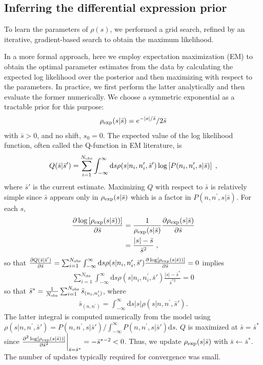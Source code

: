 \documentclass[pre,twocolumn,english,longbibliography]{revtex4}
\newcommand{\<}{\langle}
\renewcommand{\>}{\rangle}
\begin{document}
\subsection*{Inferring the differential expression prior}\label{sec:EM}
To learn the parameters of $\rho(s)$, we performed a grid search, refined by an iterative, gradient-based search to obtain the maximum likelihood.

In a more formal approach, here we employ expectation maximization (EM) to obtain the optimal parameter estimates from the data by calculating the expected log likelihood over the posterior and then maximizing with respect to the parameters. In practice, we first perform the latter analytically and then evaluate the former numerically. We choose a symmetric exponential as a tractable prior for this purpose:
\begin{align}
	\rho_{\rm exp}(s|\bar{s})=e^{-|s|/\bar{s}}/2\bar{s}
\end{align}
with $\bar{s}>0$, and no shift, $s_0=0$. The expected value of the log likelihood function, often called the Q-function in EM literature, is 
 \begin{align}
 Q(\bar{s}|\bar{s}')=\sum_{i=1}^{N_\textrm{\textrm{obs}}}\int_{-\infty}^{\infty}\mathrm{d}s\rho(s|n_i,n_i^{\prime},\bar{s}')\log \left[P(n_i,n_i^{\prime},s|\bar{s})\right]\;,
 \end{align}
 where $\bar{s}'$ is the current estimate.
 Maximizing $Q$  with respect to $\bar{s}$ is relatively simple since $\bar{s}$ appears only in $\rho_{\rm exp}(s|\bar{s})$  which is a factor in $P(n,n^{\prime},s|\bar{s})$. For each $s$,
 \begin{align}
 \frac{\partial \log \left[\rho_{\rm exp}(s|\bar{s}))\right] }{\partial\bar{s}} &=\frac{1}{\rho_{\rm exp}(s|\bar{s})} \frac{\partial\rho_{\rm exp}(s|\bar{s})}{\partial\bar{s}}\\&=\frac{|s|-\bar{s}}{\bar{s}^2}\;,
 \end{align}
so that $  \frac{\partial Q(\bar{s}|\bar{s}')}{\partial\bar{s}}=\sum_{i=1}^{N_\textrm{obs}}\int_{-\infty}^{\infty}\mathrm{d}s\rho(s|n_i,n_i^{\prime},\bar{s}')\frac{\partial \log \left[\rho_{\rm exp}(s|\bar{s}))\right] }{\partial\bar{s}} =0$ implies
\begin{align}
  \sum_{i=1}^{N_\textrm{obs}}\int_{-\infty}^{\infty}\mathrm{d}s\rho(s|n_i,n_i^{\prime},\bar{s}')\frac{|s|-\bar{s}^*}{\bar{s}^{*2}} =0
\end{align}
so that $\bar{s}^*=\frac{1}{N_\textrm{\textrm{obs}}}\sum_{i=1}^{N_\textrm{obs}}\bar{s}_{(n_i,n_i^{\prime})}$, where 
\begin{align}
\bar{s}_{(n,n^{\prime})}=\int_{-\infty}^{\infty}\mathrm{d}s|s|\rho(s|n,n^{\prime},\bar{s}').
\end{align}
The latter integral is computed numerically from the model using $\rho(s|n,n^{\prime},\bar{s}')=P(n,n^{\prime},s|\bar{s}')/\int_{-\infty}^{\infty}P(n,n^{\prime},s|\bar{s}')\mathrm{d}s	$. $Q$ is maximized at $\bar{s}=\bar{s}^*$ since  $ \frac{\partial^2 \log \left[\rho_{\rm exp}(s|\bar{s}))\right] }{\partial\bar{s}^2}\bigg|_{\bar{s}=\bar{s}^*}=-\bar{s}^{*-2} <0$. Thus, we update $\rho_{\rm exp}(s|\bar{s})$ with 
$\bar s\leftarrow\bar{s}^*$.
The number of updates typically required for convergence was small.
\end{document}
